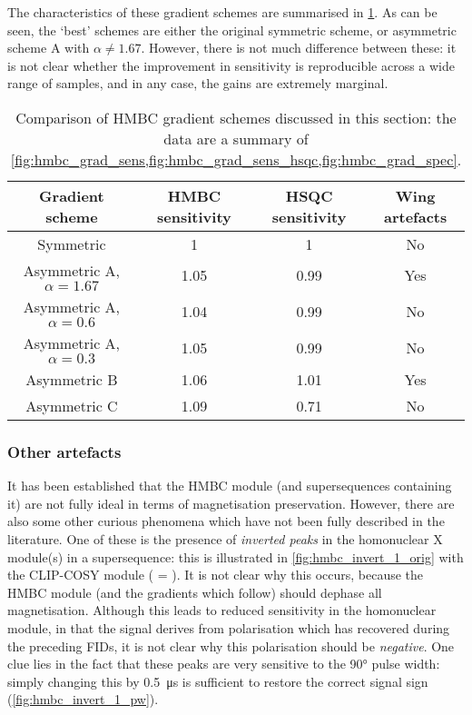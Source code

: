 The characteristics of these gradient schemes are summarised in \cref{tbl:hmbc_grads}.
As can be seen, the `best' schemes are either the original symmetric scheme, or asymmetric scheme A with $\alpha \neq 1.67$.
However, there is not much difference between these: it is not clear whether the improvement in sensitivity is reproducible across a wide range of samples, and in any case, the gains are extremely marginal.

\begin{table}[htb]
    \begin{tabular}{cccc}
        \toprule
        \textbf{Gradient scheme} & \textbf{HMBC sensitivity} & \textbf{HSQC sensitivity} & \textbf{Wing artefacts} \\
        \midrule
        Symmetric                     & 1    & 1    & No  \\
        Asymmetric A, $\alpha = 1.67$ & 1.05 & 0.99 & Yes \\
        Asymmetric A, $\alpha = 0.6$  & 1.04 & 0.99 & No  \\
        Asymmetric A, $\alpha = 0.3$  & 1.05 & 0.99 & No  \\
        Asymmetric B                  & 1.06 & 1.01 & Yes \\
        Asymmetric C                  & 1.09 & 0.71 & No  \\
        \bottomrule
    \end{tabular}
    \caption[Comparison of HMBC gradient schemes]{
        Comparison of HMBC gradient schemes discussed in this section: the data are a summary of \cref{fig:hmbc_grad_sens,fig:hmbc_grad_sens_hsqc,fig:hmbc_grad_spec}.
    }
    \label{tbl:hmbc_grads}
\end{table}


\subsubsection{Other artefacts}

It has been established that the HMBC module (and supersequences containing it) are not fully ideal in terms of magnetisation preservation.
However, there are also some other curious phenomena which have not been fully described in the literature.
One of these is the presence of \textit{inverted peaks} in the homonuclear X module(s) in a  supersequence: this is illustrated in \cref{fig:hmbc_invert_1_orig} with the CLIP-COSY module ( = ).
It is not clear why this occurs, because the HMBC module (and the gradients which follow) should dephase all  magnetisation.
Although this leads to reduced sensitivity in the homonuclear module, in that the signal derives from polarisation which has recovered during the preceding FIDs, it is not clear why this polarisation should be \textit{negative}.
One clue lies in the fact that these peaks are very sensitive to the \proton{} \ang{90} pulse width: simply changing this by \qty{0.5}{\us} is sufficient to restore the correct signal sign (\cref{fig:hmbc_invert_1_pw}).

